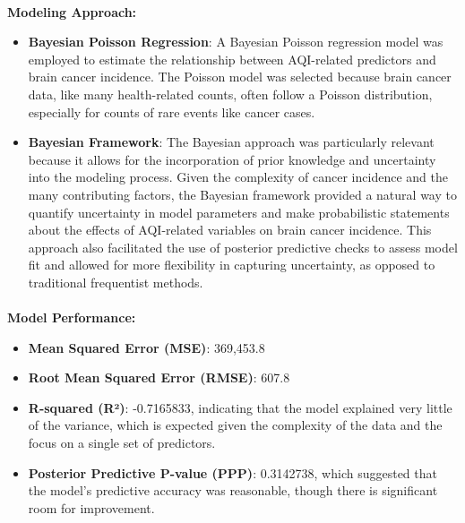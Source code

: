 \documentclass[
  12pt,
]{article}
\makeatletter
\let\oldparagraph\paragraph
\renewcommand{\paragraph}{
    \@ifstar
      \xxxParagraphStar
      \xxxParagraphNoStar
  }
\newcommand{\xxxParagraphStar}[1]{\oldparagraph*{#1}\mbox{}}
\newcommand{\xxxParagraphNoStar}[1]{\oldparagraph{#1}\mbox{}}
\makeatother
\begin{document}
\paragraph{\texorpdfstring{\textbf{Modeling
Approach:}}{Modeling Approach:}}\label{modeling-approach}

\begin{itemize}
\item
  \textbf{Bayesian Poisson Regression}: A Bayesian Poisson regression
  model was employed to estimate the relationship between AQI-related
  predictors and brain cancer incidence. The Poisson model was selected
  because brain cancer data, like many health-related counts, often
  follow a Poisson distribution, especially for counts of rare events
  like cancer cases.
\item
  \textbf{Bayesian Framework}: The Bayesian approach was particularly
  relevant because it allows for the incorporation of prior knowledge
  and uncertainty into the modeling process. Given the complexity of
  cancer incidence and the many contributing factors, the Bayesian
  framework provided a natural way to quantify uncertainty in model
  parameters and make probabilistic statements about the effects of
  AQI-related variables on brain cancer incidence. This approach also
  facilitated the use of posterior predictive checks to assess model fit
  and allowed for more flexibility in capturing uncertainty, as opposed
  to traditional frequentist methods.
\end{itemize}

\paragraph{\texorpdfstring{\textbf{Model
Performance:}}{Model Performance:}}\label{model-performance}

\begin{itemize}
\item
  \textbf{Mean Squared Error (MSE)}: 369,453.8
\item
  \textbf{Root Mean Squared Error (RMSE)}: 607.8
\item
  \textbf{R-squared (R²)}: -0.7165833, indicating that the model
  explained very little of the variance, which is expected given the
  complexity of the data and the focus on a single set of predictors.
\item
  \textbf{Posterior Predictive P-value (PPP)}: 0.3142738, which
  suggested that the model's predictive accuracy was reasonable, though
  there is significant room for improvement.
\end{itemize}
\end{document}
